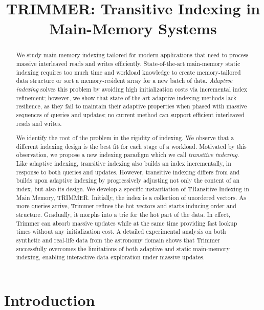 \documentclass{sig-alternate}
\begin{document}
\title{TRIMMER: Transitive Indexing in Main-Memory Systems}

\maketitle

\begin{abstract}
We study main-memory indexing tailored for modern applications that need to process massive interleaved reads and writes efficiently. State-of-the-art main-memory static indexing requires too much time and workload knowledge to create memory-tailored data structure or sort a memory-resident array for a new batch of data. {\em Adaptive indexing} solves this problem by avoiding high initialization costs via incremental index refinement; however, we show that state-of-the-art adaptive indexing methods lack resilience, as they fail to maintain their adaptive properties when phased with massive sequences of queries and updates; no current method can support efficient interleaved reads and writes.

We identify the root of the problem in the rigidity of indexing. We observe that a different indexing design is the best fit for each stage of a workload. Motivated by this observation, we propose a new indexing paradigm which we call {\em transitive indexing}. Like adaptive indexing, transitive indexing also builds an index incrementally, in response to both queries and updates. However, transitive indexing differs from and builds upon adaptive indexing by progressively adjusting not only the content of an index, but also its design. We develop a specific instantiation of TRansitive Indexing in Main Memory, TRIMMER. Initially, the index is a collection of unordered vectors. As more queries arrive, Trimmer refines the hot vectors and starts inducing order and structure. Gradually, it morphs into a trie for the hot part of the data. In effect, Trimmer can absorb massive updates while at the same time providing fast lookup times without any initialization cost. A detailed experimental analysis on both synthetic and real-life data from the astronomy domain shows that Trimmer successfully overcomes the limitations of both adaptive and static main-memory indexing, enabling interactive data exploration under massive updates.
\end{abstract}


\section{Introduction}\label{intro}
\end{document}
